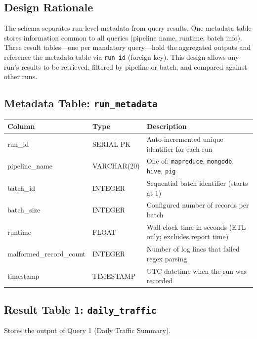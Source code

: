 \documentclass[11pt,a4paper]{article}
\begin{document}
\subsection{Design Rationale}

The schema separates run-level metadata from query results. One metadata table stores information common to all queries (pipeline name, runtime, batch info). Three result tables---one per mandatory query---hold the aggregated outputs and reference the metadata table via \texttt{run\_id} (foreign key). This design allows any run's results to be retrieved, filtered by pipeline or batch, and compared against other runs.

\subsection{Metadata Table: \texttt{run\_metadata}}

\begin{schematable}
\begin{tabularx}{\linewidth}{@{} >{\ttfamily\small}l >{\small}l X @{}}
\toprule
\textnormal{\textbf{Column}} & \textbf{Type} & \textbf{Description} \\
\midrule
run\_id              & SERIAL PK    & Auto-incremented unique identifier for each run \\
pipeline\_name       & VARCHAR(20)  & One of: \texttt{mapreduce}, \texttt{mongodb}, \texttt{hive}, \texttt{pig} \\
batch\_id            & INTEGER      & Sequential batch identifier (starts at 1) \\
batch\_size          & INTEGER      & Configured number of records per batch \\
runtime              & FLOAT        & Wall-clock time in seconds (ETL only; excludes report time) \\
malformed\_record\_count & INTEGER  & Number of log lines that failed regex parsing \\
timestamp            & TIMESTAMP    & UTC datetime when the run was recorded \\
\bottomrule
\end{tabularx}
\end{schematable}

\subsection{Result Table 1: \texttt{daily\_traffic}}

Stores the output of Query 1 (Daily Traffic Summary).
\end{document}
